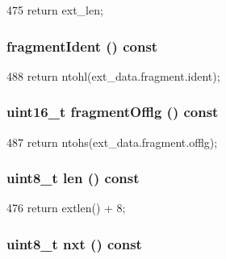 \begin{DoxyCode}
475 { return ext_len; }
\end{DoxyCode}
\hypertarget{structNet_1_1Ip6Opt_ad96851ce3053dc49058d578dd69a788a}{
\subsubsection[{fragmentIdent}]{ fragmentIdent () const}}
\label{structNet_1_1Ip6Opt_ad96851ce3053dc49058d578dd69a788a}



\begin{DoxyCode}
488 { return ntohl(ext_data.fragment.ident); }
\end{DoxyCode}
\hypertarget{structNet_1_1Ip6Opt_abfef731b01a07ca7e0e74553e1c2a003}{
\subsubsection[{fragmentOfflg}]{\setlength{\rightskip}{0pt plus 5cm}uint16\_\-t fragmentOfflg () const}}
\label{structNet_1_1Ip6Opt_abfef731b01a07ca7e0e74553e1c2a003}



\begin{DoxyCode}
487 { return ntohs(ext_data.fragment.offlg); }
\end{DoxyCode}
\hypertarget{structNet_1_1Ip6Opt_a157a538f6c0e591c974744259b42d8f3}{
\subsubsection[{len}]{\setlength{\rightskip}{0pt plus 5cm}uint8\_\-t len () const}}
\label{structNet_1_1Ip6Opt_a157a538f6c0e591c974744259b42d8f3}



\begin{DoxyCode}
476 { return extlen() + 8; }
\end{DoxyCode}
\hypertarget{structNet_1_1Ip6Opt_aa9a773e8c63669710e2900218d27c6ef}{
\subsubsection[{nxt}]{\setlength{\rightskip}{0pt plus 5cm}uint8\_\-t nxt () const}}
\label{structNet_1_1Ip6Opt_aa9a773e8c63669710e2900218d27c6ef}



